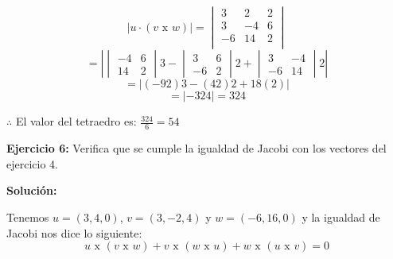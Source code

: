 \documentclass{article}
\begin{document}
$$\left| u \cdot(v\text{ x }w)\right| = \begin{vmatrix}
   3 & 2 & 2 \\
   3 & -4 & 6 \\
   -6 & 14 & 2 \\
\end{vmatrix}$$
$$ = \left|\begin{vmatrix}
   -4 & 6 \\
   14 & 2
\end{vmatrix}3-\begin{vmatrix}
   3 & 6 \\
   -6 & 2
\end{vmatrix}2+\begin{vmatrix}
   3 & -4 \\
   -6 & 14
\end{vmatrix}2\right|$$
$$ = \left| (-92)3 -(42)2+ 18(2)\right| $$
$$ = \left| -324\right| = 324$$


$\therefore$ El valor del tetraedro es: $\frac{324}{6} = 54$


\vspace*{10pt}


\textbf{Ejercicio 6:} Verifica que se cumple la igualdad de Jacobi con los vectores del ejercicio 4.
\vspace{10pt}


\textbf{Solución:}
\vspace*{10pt}


Tenemos $u =(3, 4,0)$, $v = (3, -2,4)$ y $w = (-6, 16, 0)$ y la igualdad de Jacobi nos dice lo siguiente:
$$u \text{ x }(v \text{ x } w) + v \text{ x }(w \text{ x } u) + w \text{ x }(u \text{ x } v) = 0$$
\end{document}
